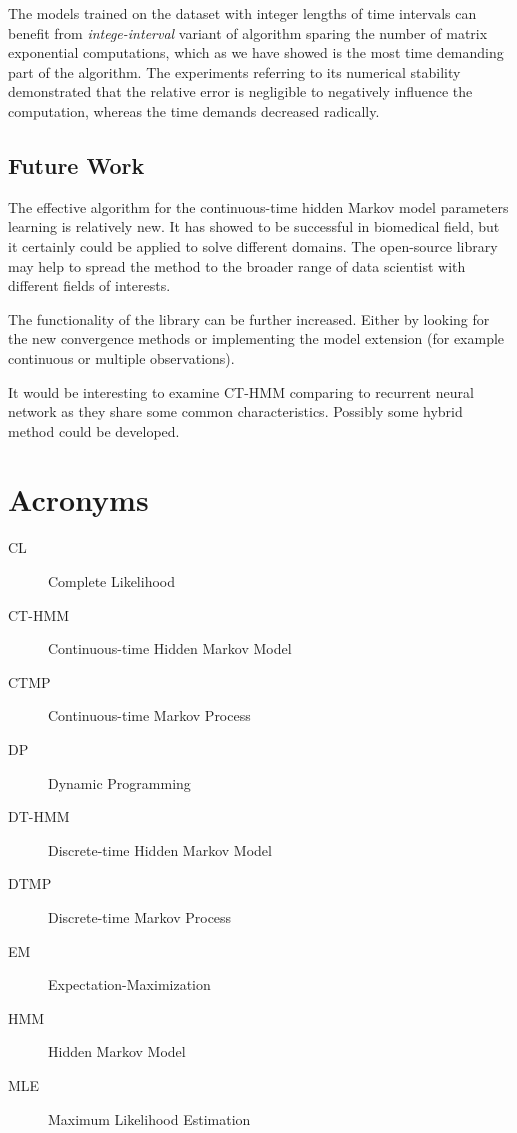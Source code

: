 \documentclass[thesis=M,english]{FITthesis}[2012/10/20]
\begin{document}
The models trained on the dataset with integer lengths of time intervals can benefit from \textit{intege-interval} variant of algorithm sparing the number of matrix exponential computations, which as we have showed is the most time demanding part of the algorithm. The experiments referring to its numerical stability demonstrated that the relative error is negligible to negatively influence the computation, whereas the time demands decreased radically.  

\section{Future Work}

The effective algorithm for the continuous-time hidden Markov model parameters learning is relatively new. It has showed to be successful in biomedical field, but it certainly could be applied to solve different domains. The open-source library may help to spread the method to the broader range of data scientist with different fields of interests. 

The functionality of the library can be further increased. Either by looking for the new convergence methods or implementing the model extension (for example continuous or multiple observations).

It would be interesting to examine CT-HMM comparing to recurrent neural network as they share some common characteristics. Possibly some hybrid method could be developed. 




\appendix

\chapter{Acronyms}
\begin{description}
	\item[CL] Complete Likelihood
	\item[CT-HMM] Continuous-time Hidden Markov Model
	\item[CTMP] Continuous-time Markov Process
	\item[DP] Dynamic Programming
	\item[DT-HMM] Discrete-time Hidden Markov Model	
	\item[DTMP] Discrete-time Markov Process	
	\item[EM] Expectation-Maximization
	\item[HMM] Hidden Markov Model 
	\item[MLE] Maximum Likelihood Estimation
	
\end{description}
\end{document}
